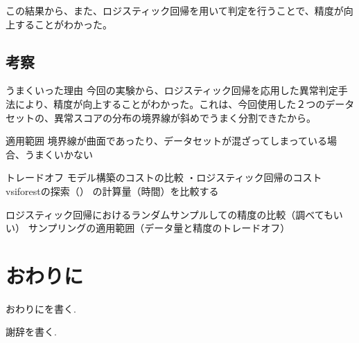 \documentclass{css}
\begin{document}
この結果から、また、ロジスティック回帰を用いて判定を行うことで、精度が向上することがわかった。

\subsection{考察}

うまくいった理由
今回の実験から、ロジスティック回帰を応用した異常判定手法により、精度が向上することがわかった。これは、今回使用した２つのデータセットの、異常スコアの分布の境界線が斜めでうまく分割できたから。

適用範囲
境界線が曲面であったり、データセットが混ざってしまっている場合、うまくいかない

トレードオフ
モデル構築のコストの比較
・ロジスティック回帰のコストvsiforestの探索（）
の計算量（時間）を比較する

ロジスティック回帰におけるランダムサンプルしての精度の比較（調べてもいい）
サンプリングの適用範囲（データ量と精度のトレードオフ）

\section{おわりに}
おわりにを書く.

\begin{acknowledgment}
謝辞を書く.
\end{acknowledgment}

\begin{thebibliography}{10}

\end{thebibliography}
\end{document}

